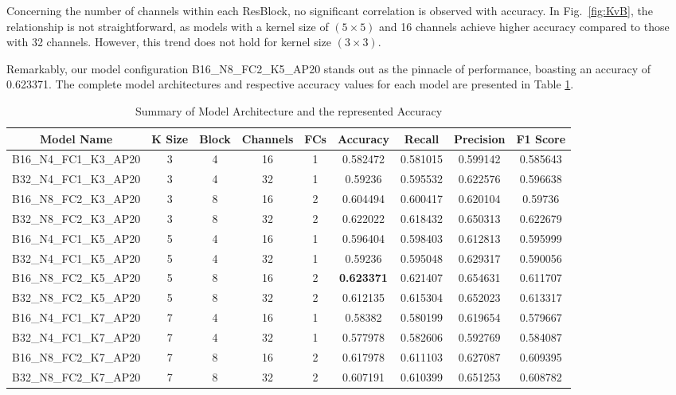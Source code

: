\documentclass[]{report}
\begin{document}
Concerning the number of channels within each ResBlock, no significant correlation is observed with accuracy. In Fig.~\ref{fig:KvB}, the relationship is not straightforward, as models with a kernel size of $(5\times5)$ and 16 channels achieve higher accuracy compared to those with 32 channels. However, this trend does not hold for kernel size $(3\times3)$.

Remarkably, our model configuration B16{\_}N8{\_}FC2{\_}K5{\_}AP20 stands out as the pinnacle of performance, boasting an accuracy of 0.623371. The complete model architectures and respective accuracy values for each model are presented in Table \ref{tab:results}.

\begin{table}[]
\caption{Summary of Model Architecture and the represented Accuracy}
\begin{tabular}{|c|c|c|c|c|c|c|c|c|}
\hline
Model Name & K Size & Block & Channels & FCs & Accuracy & Recall & Precision & F1 Score \\ \hline
B16\_N4\_FC1\_K3\_AP20 & 3 & 4 & 16 & 1 & 0.582472 & 0.581015 & 0.599142 & 0.585643 \\ \hline
B32\_N4\_FC1\_K3\_AP20 & 3 & 4 & 32 & 1 & 0.59236  & 0.595532 & 0.622576 & 0.596638 \\ \hline
B16\_N8\_FC2\_K3\_AP20 & 3 & 8 & 16 & 2 & 0.604494 & 0.600417 & 0.620104 & 0.59736  \\ \hline
B32\_N8\_FC2\_K3\_AP20 & 3 & 8 & 32 & 2 & 0.622022 & 0.618432 & 0.650313 & 0.622679 \\ \hline
B16\_N4\_FC1\_K5\_AP20 & 5 & 4 & 16 & 1 & 0.596404 & 0.598403 & 0.612813 & 0.595999 \\ \hline
B32\_N4\_FC1\_K5\_AP20 & 5 & 4 & 32 & 1 & 0.59236  & 0.595048 & 0.629317 & 0.590056 \\ \hline
B16\_N8\_FC2\_K5\_AP20 & 5 & 8 & 16 & 2 & \textbf{0.623371} & 0.621407 & 0.654631 & 0.611707 \\ \hline
B32\_N8\_FC2\_K5\_AP20 & 5 & 8 & 32 & 2 & 0.612135 & 0.615304 & 0.652023 & 0.613317 \\ \hline
B16\_N4\_FC1\_K7\_AP20 & 7 & 4 & 16 & 1 & 0.58382  & 0.580199 & 0.619654 & 0.579667 \\ \hline
B32\_N4\_FC1\_K7\_AP20 & 7 & 4 & 32 & 1 & 0.577978 & 0.582606 & 0.592769 & 0.584087 \\ \hline
B16\_N8\_FC2\_K7\_AP20 & 7 & 8 & 16 & 2 & 0.617978 & 0.611103 & 0.627087 & 0.609395 \\ \hline
B32\_N8\_FC2\_K7\_AP20 & 7 & 8 & 32 & 2 & 0.607191 & 0.610399 & 0.651253 & 0.608782 \\ \hline
\end{tabular}
\label{tab:results}
\end{table}
\end{document}
